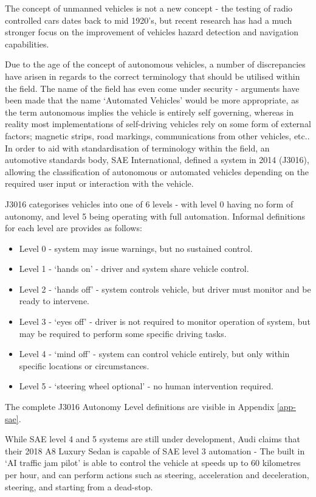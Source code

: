 The concept of unmanned vehicles is not a new concept - the testing of radio
controlled cars dates back to mid 1920's, but recent research has had a much
stronger focus on the improvement of vehicles hazard detection and navigation
capabilities.

Due to the age of the concept of autonomous vehicles, a number of discrepancies
have arisen in regards to the correct terminology that should be utilised
within the field.
The name of the field has even come under security - arguments have been made
that the name `Automated Vehicles' would be more appropriate, as the term
autonomous implies the vehicle is entirely self governing, whereas in
reality most implementations of self-driving vehicles rely on some form of
external factors; magnetic strips, road markings, communications from other
vehicles, etc..
In order to aid with standardisation of terminology within the field, an
automotive standards body, SAE International, defined a system in 2014
(J3016), allowing the classification of autonomous or automated vehicles
depending on the required user input or interaction with the vehicle.

J3016 categorises vehicles into one of 6 levels - with level 0 having no form
of autonomy, and level 5 being operating with full automation.
Informal definitions for each level are provides as follows:

\begin{itemize}
\item Level 0 - system may issue warnings, but no sustained control.
\item Level 1 - `hands on' - driver and system share vehicle control.
\item Level 2 - `hands off' - system controls vehicle, but driver must monitor
                and be ready to intervene.
\item Level 3 - `eyes off' - driver is not required to monitor operation of
                system, but may be required to perform some specific driving tasks.
\item Level 4 - `mind off' - system can control vehicle entirely, but only
                within specific locations or circumstances.
\item Level 5 - `steering wheel optional' - no human intervention required.
\end{itemize}

The complete J3016 Autonomy Level definitions are visible in Appendix \ref{app-sae}. 

While SAE level 4 and 5 systems are still under development, Audi claims that
their 2018 A8 Luxury Sedan is capable of SAE level 3 automation - The built
in `AI traffic jam pilot' is able to control the vehicle at speeds up to 60
kilometres per hour, and can perform actions such as steering, acceleration
and deceleration, steering, and starting from a dead-stop.




